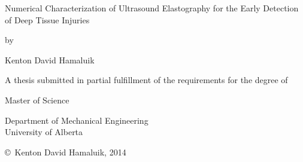 \begin{center}
	\vspace*{\fill}
	Numerical Characterization of Ultrasound Elastography for the Early Detection of Deep Tissue Injuries
	\vspace{1em}

	by
	\vspace{1em}

	Kenton David Hamaluik
	\vspace{6em}

	A thesis submitted in partial fulfillment of the requirements for the degree of
	\vspace{2em}

	Master of Science
	\vspace{6em}

	Department of Mechanical Engineering\\
	University of Alberta
	\vspace{10em}

	\copyright\ Kenton David Hamaluik, 2014
	\vspace*{\fill}
\end{center}